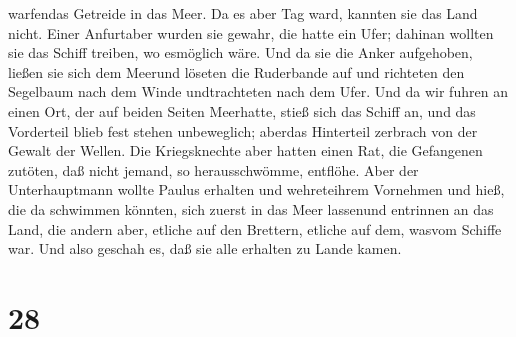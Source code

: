 warfendas Getreide in das Meer.  Da es aber Tag ward,
kannten sie das Land nicht. Einer Anfurtaber wurden sie gewahr, die
hatte ein Ufer; dahinan wollten sie das Schiff treiben, wo esmöglich
wäre.  Und da sie die Anker aufgehoben, ließen sie sich dem
Meerund löseten die Ruderbande auf und richteten den Segelbaum nach dem
Winde undtrachteten nach dem Ufer.  Und da wir fuhren an
einen Ort, der auf beiden Seiten Meerhatte, stieß sich das Schiff an,
und das Vorderteil blieb fest stehen unbeweglich; aberdas Hinterteil
zerbrach von der Gewalt der Wellen.  Die Kriegsknechte aber
hatten einen Rat, die Gefangenen zutöten, daß nicht jemand, so
herausschwömme, entflöhe.  Aber der Unterhauptmann wollte
Paulus erhalten und wehreteihrem Vornehmen und hieß, die da schwimmen
könnten, sich zuerst in das Meer lassenund entrinnen an das Land,
 die andern aber, etliche auf den Brettern, etliche auf
dem, wasvom Schiffe war. Und also geschah es, daß sie alle erhalten zu
Lande kamen.

\hypertarget{section-27}{%
\section{28}\label{section-27}}

